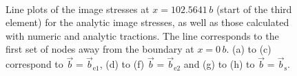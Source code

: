 \documentclass[11pt]{iopart}
\begin{document}
\begin{figure}
    ~
    \caption{Line plots of the image stresses at $x = 102.5641\, b$ (start of the third element) for the analytic image stresses, as well as those calculated with numeric and analytic tractions. The line corresponds to the first set of nodes away from the boundary at $x = 0\, b$. (a) to (c) correspond to $\vec{b} = \vec{b}_{\textrm{e1}}$, (d) to (f) $\vec{b} = \vec{b}_{\textrm{e2}}$ and (g) to (h) to $\vec{b} = \vec{b}_{\textrm{s}}$.}
    \label{f:line_head_vs_ana_vs_num}
\end{figure}
\end{document}
